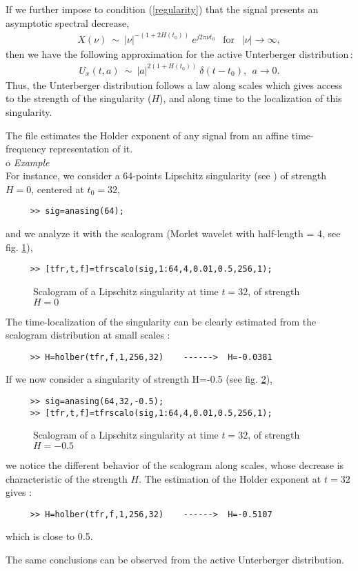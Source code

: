   If we further impose to condition (\ref{regularity}) that the signal
presents an asymptotic spectral decrease,
\begin{eqnarray*}
X(\nu) \ \sim\ |\nu|^{-(1+2H(t_0))}\ e^{j2\pi \nu t_0}\ \ \mbox{ for }\ \
|\nu|\rightarrow\infty, 
\end{eqnarray*}
then we have the following approximation for the active Unterberger
distribution\,:
\begin{eqnarray*}
U_x(t,a) \ \sim\ |a|^{2(1+H(t_0))}\ \delta(t-t_0),\ \ a\rightarrow 0.
\end{eqnarray*}
Thus, the Unterberger distribution follows a law along scales which
gives access to the strength of the singularity ($H$), and along time to
the localization of this singularity.

  The file  estimates the
Holder exponent of any signal from an affine time-frequency representation
of it.\\

o {\it Example}\\ For instance, we consider a 64-points Lipschitz
  singularity (see \index{\ttfamily anasing}{\ttfamily anasing.m}) of
  strength $H=0$, centered at $t_0=32$,
\begin{verbatim}
     >> sig=anasing(64);
\end{verbatim}
and we analyze it with the scalogram (Morlet wavelet with half-length = 4, see
fig. \ref{Ex1fig7}),
\begin{verbatim}
     >> [tfr,t,f]=tfrscalo(sig,1:64,4,0.01,0.5,256,1);
\end{verbatim}
\begin{figure}[htb]
\epsfxsize=10cm
\epsfysize=10cm
\centerline{}
\caption{\label{Ex1fig7}Scalogram of a Lipschitz singularity at time
$t=32$, of strength $H=0$}
\end{figure}
The time-localization of the singularity can be clearly estimated from
the scalogram distribution at small scales : 
\begin{verbatim}
     >> H=holber(tfr,f,1,256,32)    ------>  H=-0.0381
\end{verbatim}

If we now consider a singularity of strength H=-0.5 (see
fig. \ref{Ex1fig8}),
\begin{verbatim}
     >> sig=anasing(64,32,-0.5);
     >> [tfr,t,f]=tfrscalo(sig,1:64,4,0.01,0.5,256,1);
\end{verbatim}
\begin{figure}[htb]
\epsfxsize=10cm
\epsfysize=10cm
\centerline{}
\caption{\label{Ex1fig8}Scalogram of a Lipschitz singularity at time
$t=32$, of strength $H=-0.5$}
\end{figure}
we notice the different behavior of the scalogram along scales, whose
decrease is characteristic of the strength $H$. The estimation of the
Holder exponent at $t=32$ gives :
\begin{verbatim}
     >> H=holber(tfr,f,1,256,32)    ------>  H=-0.5107
\end{verbatim}
which is close to 0.5.

The same conclusions can be observed from the active Unterberger
distribution.

